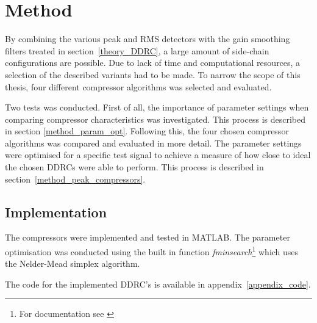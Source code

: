\documentclass[../main2.tex]{subfiles}
\providecommand{\rootdir}{..}
\begin{document}
\section{Method}\label{method}
By combining the various peak and RMS detectors with the gain smoothing filters treated in section~\ref{theory_DDRC}, a large amount of side-chain configurations are possible. Due to lack of time and computational resources, a selection of the described variants had to be made. To narrow the scope of this thesis, four different compressor algorithms was selected and evaluated.

Two tests was conducted. First of all, the importance of parameter settings when comparing compressor characteristics was investigated. This process is described in section \ref{method_param_opt}. Following this, the four chosen compressor algorithms was compared and evaluated in more detail. The parameter settings were optimised for a specific test signal to achieve a measure of how close to ideal the chosen DDRCs were able to perform. This process is described in section~\ref{method_peak_compressors}.

\subsection{Implementation} \label{method_implementation}
The compressors were implemented and tested in MATLAB\textsuperscript{\textregistered}. The parameter optimisation was conducted using the built in function \emph{fminsearch}\footnote{For documentation see \cite{fminsearch}} which uses the Nelder-Mead simplex algorithm. 

The code for the implemented DDRC's is available in appendix~\ref{appendix_code}.



%

%




\end{document}
